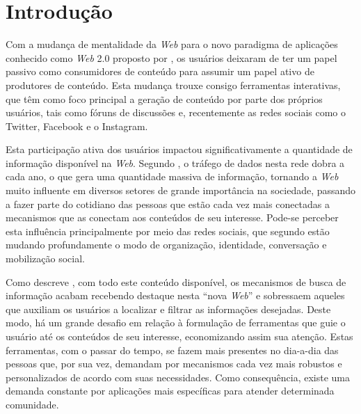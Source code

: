 \section{\esp Introdução}
Com a mudança de mentalidade da \textit{Web} para o novo paradigma de aplicações conhecido como \textit{Web} 2.0 proposto por 
, os 
usuários deixaram de ter um papel passivo como consumidores de conteúdo para assumir um papel ativo de produtores de conteúdo. Esta mudança 
trouxe consigo ferramentas interativas, que têm como foco principal a geração de conteúdo por parte dos próprios usuários, tais como fóruns 
de discussões e, recentemente as redes sociais como o Twitter, Facebook e o Instagram.

Esta participação ativa dos usuários impactou significativamente a quantidade de informação disponível na \textit{Web}. Segundo , 
o tráfego de dados nesta rede dobra a cada ano, o que gera uma quantidade massiva de informação, tornando a \textit{Web} muito influente em diversos 
setores de grande importância na sociedade, passando a fazer parte do cotidiano das pessoas que estão cada vez mais conectadas a mecanismos que
as  conectam aos conteúdos de seu interesse. Pode-se perceber esta influência principalmente por meio das redes sociais, que segundo 
 estão mudando profundamente o modo de organização, identidade, conversação e mobilização social.

Como descreve , com todo este conteúdo disponível, os mecanismos de busca de informação 
acabam recebendo destaque nesta ``nova \textit{Web}'' e sobressaem aqueles que auxiliam os usuários  a localizar e filtrar 
as informações desejadas. Deste modo, há um grande desafio em relação à formulação de ferramentas que guie o usuário até os conteúdos de seu 
interesse, economizando assim sua atenção. Estas ferramentas, com o passar do tempo, se fazem mais presentes no dia-a-dia das pessoas 
que, por sua vez, demandam por mecanismos cada vez mais robustos e personalizados de acordo com suas necessidades. Como consequência, existe 
uma demanda constante por aplicações mais específicas para atender determinada comunidade.

